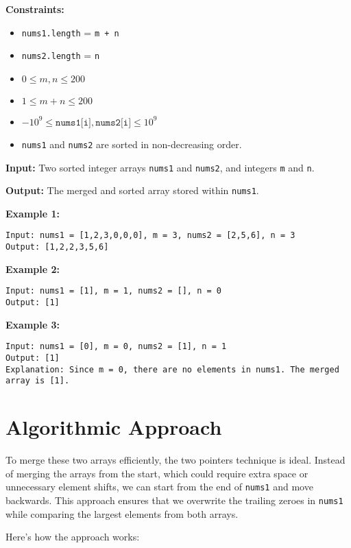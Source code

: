 \textbf{Constraints:}

\begin{itemize}
    \item \texttt{nums1.length} = \texttt{m + n}
    \item \texttt{nums2.length} = \texttt{n}
    \item $0 \leq m, n \leq 200$
    \item $1 \leq m + n \leq 200$
    \item $-10^9 \leq \texttt{nums1[i]}, \texttt{nums2[i]} \leq 10^9$
    \item \texttt{nums1} and \texttt{nums2} are sorted in non-decreasing order.
\end{itemize}

\textbf{Input:} Two sorted integer arrays \texttt{nums1} and \texttt{nums2}, and integers \texttt{m} and \texttt{n}.

\textbf{Output:} The merged and sorted array stored within \texttt{nums1}.

\textbf{Example 1:}
\begin{verbatim}
Input: nums1 = [1,2,3,0,0,0], m = 3, nums2 = [2,5,6], n = 3
Output: [1,2,2,3,5,6]
\end{verbatim}

\textbf{Example 2:}
\begin{verbatim}
Input: nums1 = [1], m = 1, nums2 = [], n = 0
Output: [1]
\end{verbatim}

\textbf{Example 3:}
\begin{verbatim}
Input: nums1 = [0], m = 0, nums2 = [1], n = 1
Output: [1]
Explanation: Since m = 0, there are no elements in nums1. The merged array is [1].
\end{verbatim}

\section*{Algorithmic Approach}

To merge these two arrays efficiently, the two pointers technique is ideal. Instead of merging the arrays from the start, which could require extra space or unnecessary element shifts, we can start from the end of \texttt{nums1} and move backwards. This approach ensures that we overwrite the trailing zeroes in \texttt{nums1} while comparing the largest elements from both arrays.

Here's how the approach works:

